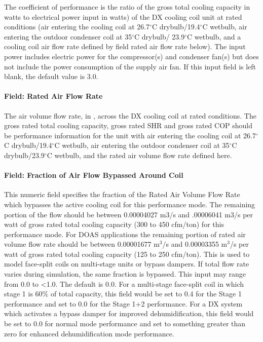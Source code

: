 The coefficient of performance is the ratio of the gross total cooling capacity in watts to electrical power input in watts) of the DX cooling coil unit at rated conditions (air entering the cooling coil at 26.7$^\circ$C drybulb/19.4$^\circ$C wetbulb, air entering the outdoor condenser coil at 35$^\circ$C drybulb/ 23.9$^\circ$C wetbulb, and a cooling coil air flow rate defined by field rated air flow rate below). The input power includes electric power for the compressor(s) and condenser fan(s) but does not include the power consumption of the supply air fan. If this input field is left blank, the default value is 3.0.

\paragraph{Field: Rated Air Flow Rate}\label{field-rated-air-flow-rate-3}

The air volume flow rate, in \si{\volumeFlowRate}, across the DX cooling coil at rated conditions. The gross rated total cooling capacity, gross rated SHR and gross rated COP should be performance information for the unit with air entering the cooling coil at 26.7$^\circ$C drybulb/19.4$^\circ$C wetbulb, air entering the outdoor condenser coil at 35$^\circ$C drybulb/23.9$^\circ$C wetbulb, and the rated air volume flow rate defined here.

\paragraph{Field: Fraction of Air Flow Bypassed Around Coil}\label{field-fraction-of-air-flow-bypassed-around-coil}

This numeric field specifies the fraction of the Rated Air Volume Flow Rate which bypasses the active cooling coil for this performance mode. The remaining portion of the flow should be between 0.00004027 m3/s and .00006041 m3/s per watt of gross rated total cooling capacity (300 to 450 cfm/ton) for this performance mode. For DOAS applications the remaining portion of rated air volume flow rate should be between 0.00001677 m\(^{3}\)/s and 0.00003355 m\(^{3}\)/s per watt of gross rated total cooling capacity (125 to 250 cfm/ton). This is used to model face-split coils on multi-stage units or bypass dampers. If total flow rate varies during simulation, the same fraction is bypassed. This input may range from 0.0 to \textless{}1.0. The default is 0.0. For a multi-stage face-split coil in which stage 1 is 60\% of total capacity, this field would be set to 0.4 for the Stage 1 performance and set to 0.0 for the Stage 1+2 performance. For a DX system which activates a bypass damper for improved dehumidification, this field would be set to 0.0 for normal mode performance and set to something greater than zero for enhanced dehumidification mode performance.

